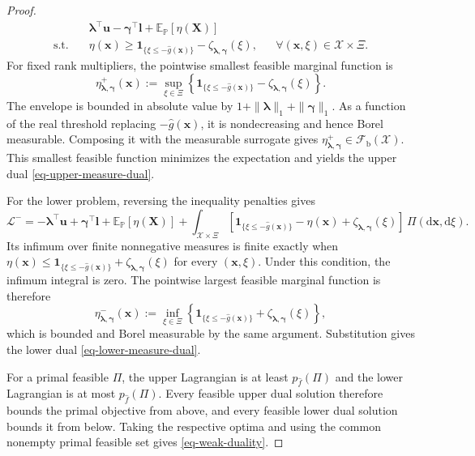 \documentclass[review,11pt,3p,authoryear,nopreprintline]{elsarticle}
\begin{document}
\begin{proof}
\begin{equation*}
\begin{aligned}
      \quad &\bm\lambda^\top\bm u-\bm\gamma^\top\bm l+\mathbb E_{\mathbb P}\left[\eta(\bm X)\right]\\
      \text{s.t.}\quad & \eta(\bm x)\ge
      \mathbf1_{\{\xi\le-\hat g(\bm x)\}}
      -\zeta_{\bm\lambda,\bm\gamma}(\xi),
      && \forall(\bm x,\xi)\in\mathcal X\times\Xi.
    \end{aligned}
  \end{equation*}
  For fixed rank multipliers, the pointwise smallest feasible marginal function is
  \begin{equation*}
    \eta^+_{\bm\lambda,\bm\gamma}(\bm x)
    :=\sup_{\xi\in\Xi}\left\{
      \mathbf1_{\{\xi\le-\hat g(\bm x)\}}
      -\zeta_{\bm\lambda,\bm\gamma}(\xi)
    \right\}.
  \end{equation*}
  The envelope is bounded in absolute value by $1+\|\bm\lambda\|_1+\|\bm\gamma\|_1$. As a function of the real threshold replacing $-\hat g(\bm x)$, it is nondecreasing and hence Borel measurable. Composing it with the measurable surrogate gives $\eta^+_{\bm\lambda,\bm\gamma}\in\mathcal F_{\mathrm b}(\mathcal X)$. This smallest feasible function minimizes the expectation and yields the upper dual \eqref{eq-upper-measure-dual}.

  For the lower problem, reversing the inequality penalties gives
  \begin{equation*}
    \mathcal L^-
    =-\bm\lambda^\top\bm u+\bm\gamma^\top\bm l
      +\mathbb E_{\mathbb P}\left[\eta(\bm X)\right]
      +\int_{\mathcal X\times\Xi}\left[
        \mathbf1_{\{\xi\le-\hat g(\bm x)\}}-\eta(\bm x)+\zeta_{\bm\lambda,\bm\gamma}(\xi)
      \right]\,\Pi(\mathrm d\bm x,\mathrm d\xi).
  \end{equation*}
  Its infimum over finite nonnegative measures is finite exactly when $\eta(\bm x)\le\mathbf1_{\{\xi\le-\hat g(\bm x)\}}+\zeta_{\bm\lambda,\bm\gamma}(\xi)$ for every $(\bm x,\xi)$. Under this condition, the infimum integral is zero. The pointwise largest feasible marginal function is therefore
  \begin{equation*}
    \eta^-_{\bm\lambda,\bm\gamma}(\bm x)
    :=\inf_{\xi\in\Xi}\left\{
      \mathbf1_{\{\xi\le-\hat g(\bm x)\}}
      +\zeta_{\bm\lambda,\bm\gamma}(\xi)
    \right\},
  \end{equation*}
  which is bounded and Borel measurable by the same argument. Substitution gives the lower dual \eqref{eq-lower-measure-dual}.

  For a primal feasible $\Pi$, the upper Lagrangian is at least $p_{\hat f}(\Pi)$ and the lower Lagrangian is at most $p_{\hat f}(\Pi)$. Every feasible upper dual solution therefore bounds the primal objective from above, and every feasible lower dual solution bounds it from below. Taking the respective optima and using the common nonempty primal feasible set gives \eqref{eq-weak-duality}.
\end{proof}
\end{document}
